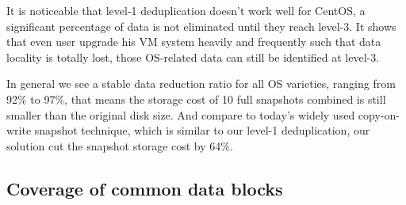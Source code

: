 It is noticeable that level-1 deduplication doesn't work well for CentOS, a significant percentage of data is not
eliminated until they reach level-3. It shows that even user upgrade his VM system heavily and frequently
such that data locality is totally lost, those OS-related data can still be identified at level-3. 

In general we see a stable data reduction ratio for all OS varieties, ranging from 92\% to 97\%, that means
the storage cost of 10 full snapshots combined is still smaller than the original disk size. And compare to 
today's widely used copy-on-write snapshot technique, which is similar to our level-1 deduplication, our
solution cut the snapshot storage cost by 64\%.




\subsection{Coverage of common data blocks}



